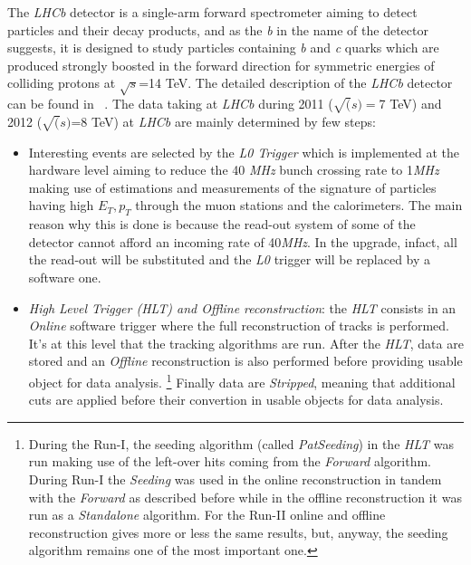 \documentclass[paper=a4, fontsize=10pt]{scrartcl}
\numberwithin{equation}{section}		%
\numberwithin{figure}{section}			%
\numberwithin{table}{section}				%
\begin{document}
The \textit{LHCb} detector is a single-arm forward spectrometer aiming to detect particles and their decay products, and as the \textit{b} in the name of the detector suggests, it is designed to study particles containing \textit{b} and \textit{c} quarks which are produced strongly boosted in the forward direction for symmetric energies of colliding protons at $\sqrt{s}$=14 TeV.%
The detailed description of the \textit{LHCb} detector can be found in ~\cite{Blake1}.
The data taking at \textit{LHCb} during 2011 ($\sqrt(s)=$7 TeV) and 2012 ($\sqrt(s)$=8 TeV) at \textit{LHCb} are mainly determined by few steps:
\begin{itemize}
\item{Interesting events are selected by the \textit{L0 Trigger} which is implemented at the hardware level aiming to reduce the 40 \textit{MHz} bunch crossing rate to 1\textit{MHz} making use of estimations and measurements of the signature of particles having high $E_{T},p_{T}$ through the muon stations and the calorimeters. The main reason why this is done is because the read-out system of some of the detector cannot afford an incoming rate of 40\textit{MHz}. In the upgrade, infact, all the read-out will be substituted and the \textit{L0} trigger will be replaced by a software one.}
\item{\textit{High Level Trigger (HLT) and Offline reconstruction}: the \textit{HLT} consists in an \textit{Online} software trigger where the full reconstruction of tracks is performed. It's at this level that the tracking algorithms are run. After the \textit{HLT}, data are stored and an \textit{Offline} reconstruction is also performed before providing usable object for data analysis. \footnote{During the Run-I, the seeding algorithm (called \textit{PatSeeding}) in the \textit{HLT} was run making use of the left-over hits coming from the \textit{Forward} algorithm. During Run-I the \textit{Seeding} was used in the online reconstruction in tandem with the \textit{Forward} as described before while in the offline reconstruction it was run as a \textit{Standalone} algorithm. For the Run-II online and offline reconstruction gives more or less the same results, but, anyway, the seeding algorithm remains one of the most important one.} Finally data are \textit{Stripped}, meaning that additional cuts are applied before their convertion in usable objects for data analysis.}

\end{itemize}
\end{document}
